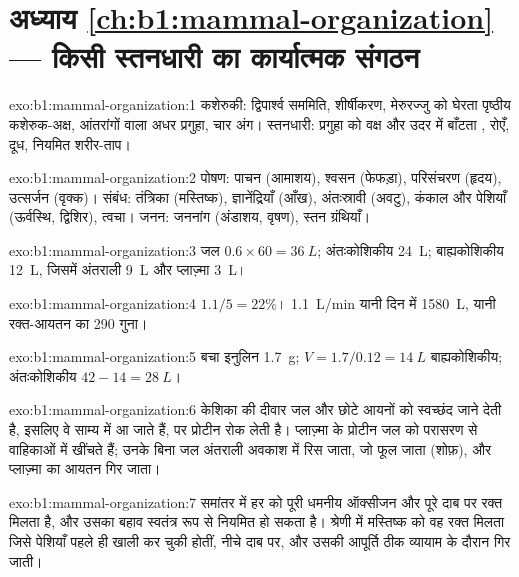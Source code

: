 \section*{अध्याय \ref{ch:b1:mammal-organization} --- किसी स्तनधारी का कार्यात्मक संगठन}

\begin{solution}{exo:b1:mammal-organization:1}
कशेरुकी: द्विपार्श्व सममिति, शीर्षीकरण, मेरुरज्जु को घेरता पृष्ठीय
कशेरुक-अक्ष, आंतरांगों वाला अधर प्रगुहा, चार अंग।
स्तनधारी: प्रगुहा को वक्ष और उदर में बाँटता ,
रोएँ, दूध, नियमित शरीर-ताप।
\end{solution}

\begin{solution}{exo:b1:mammal-organization:2}
पोषण: पाचन (आमाशय), श्वसन (फेफड़ा), परिसंचरण
(हृदय), उत्सर्जन (वृक्क)। संबंध: तंत्रिका (मस्तिष्क), ज्ञानेंद्रियाँ
(आँख), अंतःस्रावी (अवटु), कंकाल और पेशियाँ (ऊर्वस्थि, द्विशिर), त्वचा।
जनन: जननांग (अंडाशय, वृषण), स्तन ग्रंथियाँ।
\end{solution}

\begin{solution}{exo:b1:mammal-organization:3}
जल $0.6\times 60 = \qty{36}{L}$; अंतःकोशिकीय \qty{24}{L};
बाह्यकोशिकीय \qty{12}{L}, जिसमें अंतराली \qty{9}{L} और प्लाज़्मा
\qty{3}{L}।
\end{solution}

\begin{solution}{exo:b1:mammal-organization:4}
$1.1/5 = 22\%$। \qty{1.1}{L/min} यानी दिन में \qty{1580}{L}, यानी
रक्त-आयतन का 290 गुना।
\end{solution}

\begin{solution}{exo:b1:mammal-organization:5}
बचा इनुलिन \qty{1.7}{g}; $V = 1.7/0.12 = \qty{14}{L}$
बाह्यकोशिकीय; अंतःकोशिकीय $42 - 14 = \qty{28}{L}$।
\end{solution}

\begin{solution}{exo:b1:mammal-organization:6}
केशिका की दीवार जल और छोटे आयनों को स्वच्छंद जाने देती है, इसलिए वे साम्य
में आ जाते हैं, पर प्रोटीन रोक लेती है। प्लाज़्मा के प्रोटीन जल को परासरण
से वाहिकाओं में खींचते हैं; उनके बिना जल अंतराली अवकाश में रिस जाता, जो
फूल जाता (शोफ़), और प्लाज़्मा का आयतन गिर जाता।
\end{solution}

\begin{solution}{exo:b1:mammal-organization:7}
समांतर में हर  को पूरी धमनीय ऑक्सीजन और पूरे दाब पर रक्त मिलता है, और
उसका बहाव स्वतंत्र रूप से नियमित हो सकता है। श्रेणी में मस्तिष्क को वह
रक्त मिलता जिसे पेशियाँ पहले ही खाली कर चुकी होतीं, नीचे दाब पर, और उसकी
आपूर्ति ठीक व्यायाम के दौरान गिर जाती।
\end{solution}

